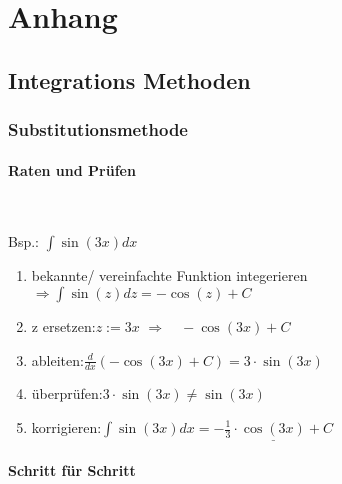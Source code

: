 \section{Anhang}
	\subsection{Integrations Methoden}
		\subsubsection{Substitutionsmethode}
			
			\paragraph{Raten und Prüfen}\
						
				\begin{minipage}[c]{.2\textwidth}
					Bsp.: $ \int \sin{(3x)} dx $
				\end{minipage}
				\begin{minipage}{.8\textwidth}
					\begin{enumerate}
						\item bekannte/ vereinfachte Funktion integerieren \quad $\Rightarrow \int \sin{(z)} dz = -\cos(z) + C $
						\item z ersetzen:\quad $ z := 3x $ \quad $ \Rightarrow \quad -\cos(3x) + C $
						\item ableiten:\quad $ \frac{d}{dx} \left( -\cos{(3x)} + C \right) = 3 \cdot\sin{(3x)} $ 
						\item überprüfen:\quad $ 3 \cdot\sin{(3x)} \neq  \sin{(3x)} $
						\item korrigieren:\quad $ \int \sin{(3x)} dx = \underline{-\frac{1}{3} \cdot \cos{(3x)} + C}$
						
					\end{enumerate}
				\end{minipage}
			
			\paragraph{Schritt für Schritt}\
			

